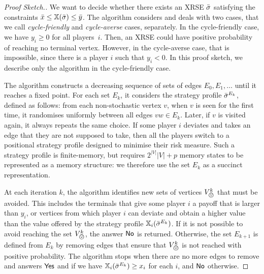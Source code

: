 \begin{proof}[Proof Sketch.]
    We want to decide whether there exists an XRSE ${\bar{\sigma}}$ satisfying the constraints $\Bar{x}\leq \mathbb{X}({\bar{\sigma}}) \leq \Bar{y}$.
    The algorithm considers and deals with two cases, that we call \emph{cycle-friendly} and \emph{cycle-averse} cases, separately.
    In the cycle-friendly case, we have $y_i \geq 0$ for all players~$i$.
    Then, an XRSE could have positive probability of reaching no terminal vertex.
    However, in the cycle-averse case, that is impossible, since there is a player $i$ such that $y_i < 0$.
    In this proof sketch, we describe only the algorithm in the cycle-friendly case.

    The algorithm constructs a decreasing sequence of sets of edges $E_0, E_1, \dots$ until it reaches a fixed point.
    For each set $E_k$, it considers the strategy profile ${\bar{\sigma}}^{E_k}$, defined as follows: from each non-stochastic vertex $v$, when $v$ is seen for the first time, it randomises uniformly between all edges $vw \in E_k$.
    Later, if $v$ is visited again, it always repeats the same choice.
    If some player $i$ deviates and takes an edge that they are not supposed to take, then all the players switch to a positional strategy profile designed to minimise their risk measure.
    Such a strategy profile is finite-memory, but requires $2^{|V|}|V| + p$ memory states to be represented as a memory structure: we therefore use the set $E_k$ as a succinct representation.

    At each iteration $k$, the algorithm identifies new sets of vertices $V_\bad^k$ that must be avoided. This includes the terminals that give some player $i$ a payoff that is larger than $y_i$, or vertices from which player $i$ can deviate and obtain a higher value than the value offered by the strategy profile $\mathbb{X}_i({\bar{\sigma}}^{E_k})$. 
    If it is not possible to avoid reaching the set $V_\bad^k$, the answer $\mathsf{No}$ is returned.
    Otherwise, the set $E_{k+1}$ is defined from $E_k$ by removing 
    edges that ensure that $V_\bad^k$ is not reached with positive probability.
    The algorithm stops when there are no more edges to remove and answers $\mathsf{Yes}$ and if we have $\mathbb{X}_i({\bar{\sigma}}^{E_k}) \geq x_i$ for each $i$, and $\mathsf{No}$ otherwise.


\end{proof}
